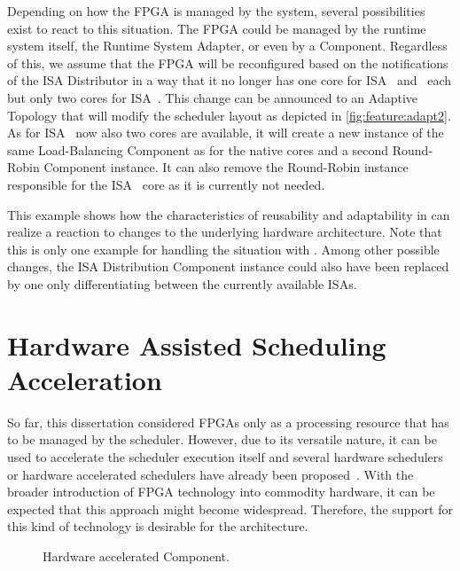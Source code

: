 Depending on how the \ac{FPGA} is managed by the system, several possibilities exist to react to this situation. The \ac{FPGA} could be managed by the runtime system itself, the Runtime System Adapter, or even by a Component. Regardless of this, we assume that the \ac{FPGA} will be reconfigured based on the notifications of the ISA Distributor in a way that it no longer has one core for \ac{ISA}~\textalpha{} and~\textbeta{} each but only two cores for \ac{ISA}~\textbeta{}. This change can be announced to an Adaptive Topology that will modify the scheduler layout as depicted in \cref{fig:feature:adapt2}. As for \ac{ISA}~\textbeta{} now also two cores are available, it will create a new instance of the same Load-Balancing Component as for the native cores and a second Round-Robin Component instance. It can also remove the Round-Robin instance responsible for the \ac{ISA}~\textalpha{} core as it is currently not needed.

This example shows how the characteristics of reusability and adaptability in \cobas{} can realize a reaction to changes to the underlying hardware architecture. Note that this is only one example for handling the situation with \cobas{}. Among other possible changes, the ISA Distribution Component instance could also have been replaced by one only differentiating between the currently available \acp{ISA}.

\section{Hardware Assisted Scheduling Acceleration}%
\label{sec:prop:fpga}

So far, this dissertation considered \acp{FPGA} only as a processing resource that has to be managed by the scheduler. However, due to its versatile nature, it can be used to accelerate the scheduler execution itself and several hardware schedulers or hardware accelerated schedulers have already been proposed~\cite{Agron-2004-FPGAScheduler, Hildebrandt-2000-FPGAScheduler, Hildebrandt-1999-FPGAScheduler, Burleson-1999-FPGAScheduler, Gaitan-2015-FPGAScheduler}. With the broader introduction of \ac{FPGA} technology into commodity hardware, it can be expected that this approach might become widespread. Therefore, the support for this kind of technology is desirable for the \cobas{} architecture.

\begin{figure}[b!] \centering \vspace{5mm}
	\caption[Hardware accelerated CoBaS Component.]{Hardware accelerated \cobas{} Component.}%
	\label{fig:feature:fpga}
\end{figure}


